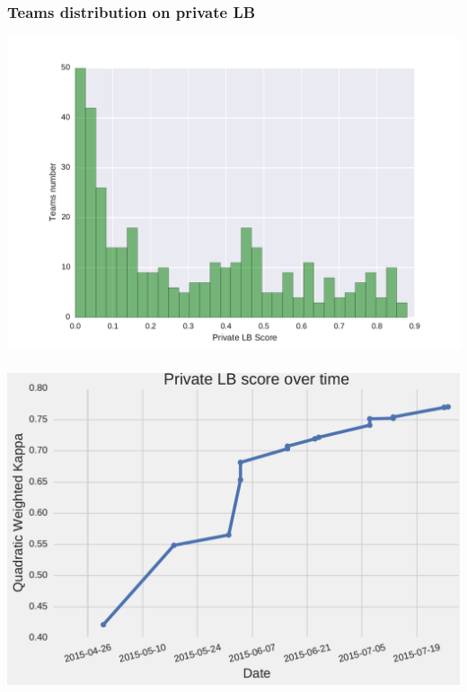 \begin{frame}\frametitle{Teams distribution on private LB} 
\vspace{-5pt}
\begin{center}
\includegraphics[width=\textwidth]{pics/private_lb_distribution.pdf}
\end{center}
\end{frame}


\begin{frame}\frametitle{} 
\begin{center}
\includegraphics[width=\textwidth]{pics/private_lb_score_increase.pdf}
\end{center}
\end{frame}

